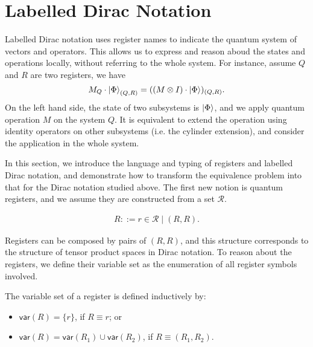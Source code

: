 


\newcommand{\var}{\mathsf{var}}
\newcommand{\reg}{\mathsf{Reg}}
\newcommand{\DType}{\mathcal{D}}
\newcommand{\cR}{\mathcal{R}}
\newcommand{\cN}{\mathcal{N}}
\newcommand{\tD}{\tilde{D}}
\newcommand{\te}{\tilde{e}}
\newcommand{\tT}{\tilde{T}}
\newcommand{\tADD}{\widetilde{ADD}}
\newcommand{\bU}{\mathbf{U}}
\newcommand{\<}{\langle}
\newcommand{\simp}{\mathsf{Simp}}
\newcommand{\List}{\mathsf{list}}
\renewcommand{\>}{\rangle}


\section{Labelled Dirac Notation}
\label{sec: labelled}
Labelled Dirac notation uses register names to indicate the quantum system of vectors and operators. This allows us to express and reason aboud the states and operations locally, without referring to the whole system. For instance, assume $Q$ and $R$ are two registers, we have
\[
    M_Q \cdot \ket{\Phi}_{(Q, R)} = ((M \otimes I) \cdot \ket{\Phi})_{(Q, R)}.
\]
On the left hand side, the state of two subsystems is $\ket{\Phi}$, and we apply quantum operation $M$ on the system $Q$. It is equivalent to extend the operation using identity operators on other subsystems (i.e. the cylinder extension), and consider the application in the whole system.


In this section, we introduce the language and typing of registers and labelled Dirac notation, and demonstrate how to transform the equivalence problem into that for the Dirac notation studied above.
The first new notion is quantum registers, and we assume they are constructed from a set $\cR$.
\begin{definition}
  \begin{align*}
    R ::= r\in\cR \mid (R, R).
  \end{align*}
\end{definition}

Registers can be composed by pairs of $(R, R)$, and this structure corresponds to the structure of tensor product spaces in Dirac notation.
To reason about the registers, we define their variable set as the enumeration of all register symbols involved.

\begin{definition}
The variable set of a register is defined inductively by:
\begin{itemize}
    \item $\var(R) = \{r\}$, if $R\equiv r$; or
    \item $\var(R) = \var(R_1) \cup\var(R_2)$, if $R\equiv (R_1,R_2)$.
\end{itemize}
\end{definition}

